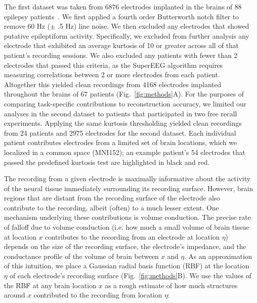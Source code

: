 \documentclass[11pt]{article}
\begin{document}
The first dataset was taken from 6876 electrodes implanted in the
brains of 88 epilepsy patients~\cite{SedeEtal03, SedeEtal07a,
  SedeEtal07b, MannEtal11, MannEtal12}.  We first applied a fourth
order Butterworth notch filter to remove 60 Hz ($\pm$ .5 Hz) line
noise.  We then excluded any electrodes that showed putative
epileptiform activity.  Specifically, we excluded from further
analysis any electrode that exhibited an average kurtosis of 10 or
greater across all of that patient's recording sessions.  We also
excluded any patients with fewer than 2 electrodes that passed this
criteria, as the SuperEEG algorithm requires measuring correlations
between 2 or more electrodes from each patient.  Altogether this
yielded clean recordings from 4168 electrodes implanted throughout the
brains of 67 patients (Fig.~\ref{fig:methods}A). For the purposes of
comparing task-specific contributions to reconstruction accuracy, we
limited our analyses in the second dataset to patients that
participated in two free recall experiments.  Applying the same
kurtosis thresholding yielded clean recordings from 24 patients and
2975 electrodes for the second dataset. Each individual patient
contributes electrodes from a limited set of brain locations, which we
localized in a common space (MNI152); an example patient's 54
electrodes that passed the predefined kurtosis test are highlighted in
black and red.


The recording from a given electrode is maximally informative about
the activity of the neural tissue immediately surrounding its
recording surface.  However, brain regions that are distant from the
recording surface of the electrode also contribute to the recording,
albeit (often) to a much lesser extent.  One mechanism underlying these
contributions is volume conduction.  The precise rate of falloff due
to volume conduction (i.e. how much a small volume of brain tissue at
location $x$ contributes to the recording from an electrode at
location $\eta$) depends on the size of the recording surface, the
electrode's impedance, and the conductance profile of the volume of
brain between $x$ and $\eta$.  As an approximation of this intuition,
we place a Gaussian radial basis function (RBF) at the location $\eta$
of each electrode's recording surface (Fig.~\ref{fig:methods}B).  We
use the values of the RBF at any brain location $x$ as a rough
estimate of how much structures around $x$ contributed to the
recording from location $\eta$:
\end{document}
